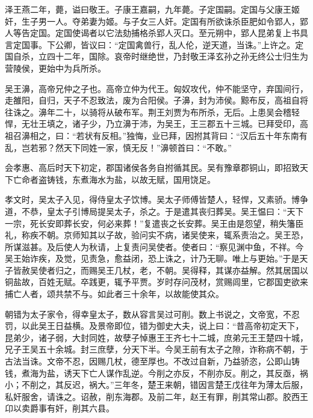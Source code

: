 \documentclass[12pt,UTF8]{ctexbook}
\begin{document}
泽王燕二年，薨，谥曰敬王。子康王嘉嗣，九年薨。子定国嗣。定国与父康王姬奸，生子男一人。夺弟妻为姬。与子女三人奸。定国有所欲诛杀臣肥如令郢人，郢人等告定国。定国使谒者以它法劾捕格杀郢人灭口。至元朔中，郢人昆弟复上书具言定国事。下公卿，皆议曰：“定国禽兽行，乱人伦，逆天道，当诛。”上许之。定国自杀，立四十二年，国除。哀帝时继绝世，乃封敬王泽玄孙之孙无终公士归生为营陵侯，更始中为兵所杀。



吴王濞，高帝兄仲之子也。高帝立仲为代王。匈奴攻代，仲不能坚守，弃国间行，走雒阳，自归，天子不忍致法，废为合阳侯。子濞，封为沛侯。黥布反，高祖自将往诛之。濞年二十，以骑将从破布军。荆王刘贾为布所杀，无后。上患吴会稽轻悍，无壮王填之，诸子少，乃立濞于沛，为吴王，王三郡五十三城。已拜受印，高祖召濞相之，曰：“若状有反相。”独悔，业已拜，因拊其背曰：“汉后五十年东南有乱，岂若邪？然天下同姓一家，慎无反！”濞顿首曰：“不敢。”



会孝惠、高后时天下初定，郡国诸侯各务自拊循其民。吴有豫章郡铜山，即招致天下亡命者盗铸钱，东煮海水为盐，以故无赋，国用饶足。



孝文时，吴太子入见，得侍皇太子饮博。吴太子师傅皆楚人，轻悍，又素骄。博争道，不恭，皇太子引博局提吴太子，杀之。于是遣其丧归葬吴。吴王愠曰：“天下一宗，死长安即葬长安，何必来葬！”复遣丧之长安葬。吴王由是怨望，稍失籓臣礼，称疾不朝。京师知其以子故，验问实不病，诸吴使来，辄系责治之。吴王恐，所谋滋甚。及后使人为秋请，上复责问吴使者。使者曰：“察见渊中鱼，不祥。今吴王始诈疾，及觉，见责急，愈益闭，恐上诛之，计乃无聊。唯上与更始。”于是天子皆赦吴使者归之，而赐吴王几杖，老，不朝。吴得释，其谋亦益解。然其居国以铜盐故，百姓无赋。卒践更，辄予平贾。岁时存问茂材，赏赐闾里，它郡国吏欲来捕亡人者，颂共禁不与。如此者三十余年，以故能使其众。



朝错为太子家令，得幸皇太子，数从容言吴过可削。数上书说之，文帝宽，不忍罚，以此吴王日益横。及景帝即位，错为御史大夫，说上曰：“昔高帝初定天下，昆弟少，诸子弱，大封同姓，故孽子悼惠王王齐七十二城，庶弟元王王楚四十城，兄子王吴五十余城。封三庶孽，分天下半。今吴王前有太子之隙，诈称病不朝，于古法当诛。文帝不忍，因赐几杖，德至厚也。不改过自新，乃益骄恣，公即山铸钱，煮海为盐，诱天下亡人谋作乱逆。今削之亦反，不削亦反。削之，其反亟，祸小；不削之，其反迟，祸大。”三年冬，楚王来朝，错因言楚王戊往年为薄太后服，私奸服舍，请诛之。诏赦，削东海郡。及前二年，赵王有罪，削其常山郡。胶西王卬以卖爵事有奸，削其六县。
\end{document}
